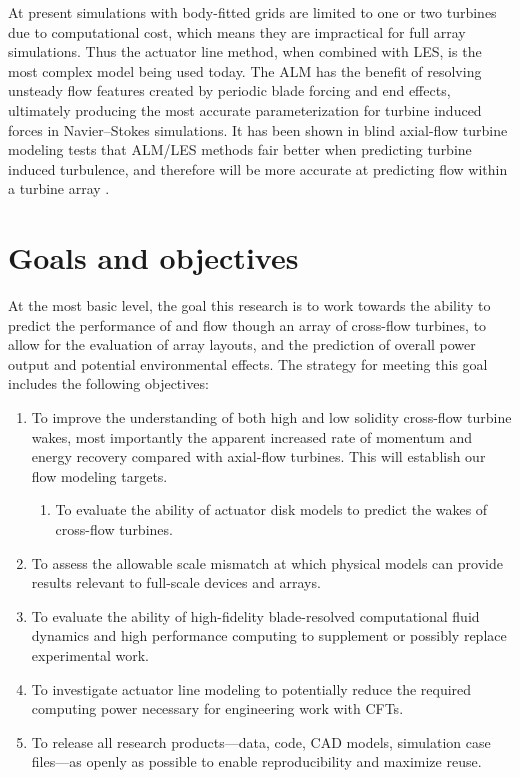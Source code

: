 At present simulations with body-fitted grids are limited to one or two turbines
due to computational cost, which means they are impractical for full array
simulations. Thus the actuator line method, when combined with LES, is the most
complex model being used today. The ALM has the benefit of resolving unsteady
flow features created by periodic blade forcing and end effects, ultimately
producing the most accurate parameterization for turbine induced forces in
Navier--Stokes simulations. It has been shown in blind axial-flow turbine
modeling tests that ALM/LES methods fair better when predicting turbine induced
turbulence, and therefore will be more accurate at predicting flow within a
turbine array \cite{Krogstad2013}.


\section{Goals and objectives}

At the most basic level, the goal this research is to work towards the ability
to predict the performance of and flow though an array of cross-flow turbines,
to allow for the evaluation of array layouts, and the prediction of overall
power output and potential environmental effects. The strategy for meeting this
goal includes the following objectives:

\begin{enumerate}
	\item To improve the understanding of both high and low solidity cross-flow
    turbine wakes, most importantly the apparent increased rate of momentum and
    energy recovery compared with axial-flow turbines. This will establish our flow
    modeling targets.
    
    \begin{enumerate}
        \item To evaluate the ability of actuator disk models to predict the
        wakes of cross-flow turbines.
    \end{enumerate}
	
	\item To assess the allowable scale mismatch at which physical models can
	provide results relevant to full-scale devices and arrays.
	
	\item To evaluate the ability of high-fidelity blade-resolved computational
    fluid dynamics and high performance computing to supplement or possibly replace
    experimental work.
    
    \item To investigate actuator line modeling to potentially reduce the
    required computing power necessary for engineering work with CFTs.
    
    \item To release all research products---data, code, CAD models, simulation
    case files---as openly as possible to enable reproducibility and maximize
    reuse.
\end{enumerate}


